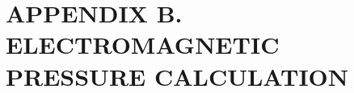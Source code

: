 \documentclass[twoside, 10pt, ptm]{article}
\begin{document}
\begin{multicols}{2}








\end{multicols}

    \section*{\centering\uppercase{Appendix B. Electromagnetic pressure
calculation}}\label{appendix-b.-electromagnetic-pressure-calculation}
\vspace{-3.5mm}
\end{document}
